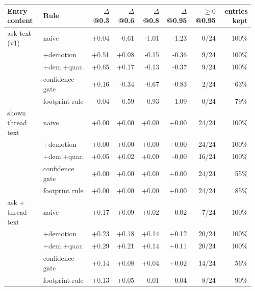 \begin{tabular}{llrrrrrr}\toprule Entry content & Rule & $\Delta$@0.3 & $\Delta$@0.6 & $\Delta$@0.8 & $\Delta$@0.95 & $\ge0$ @0.95 & entries kept\\\midrule
ask text (v1) & naive & +0.04 & -0.61 & -1.01 & -1.23 & 0/24 & 100\%\\
 & +demotion & +0.51 & +0.08 & -0.15 & -0.36 & 9/24 & 100\%\\
 & +dem.+quar. & +0.65 & +0.17 & -0.13 & -0.37 & 9/24 & 100\%\\
 & confidence gate & +0.16 & -0.34 & -0.67 & -0.83 & 2/24 & 63\%\\
 & footprint rule & -0.04 & -0.59 & -0.93 & -1.09 & 0/24 & 79\%\\
\addlinespace[2pt]
shown thread text & naive & +0.00 & +0.00 & +0.00 & +0.00 & 24/24 & 100\%\\
 & +demotion & +0.00 & +0.00 & +0.00 & +0.00 & 24/24 & 100\%\\
 & +dem.+quar. & +0.05 & +0.02 & +0.00 & -0.00 & 16/24 & 100\%\\
 & confidence gate & +0.00 & +0.00 & +0.00 & +0.00 & 24/24 & 55\%\\
 & footprint rule & +0.00 & +0.00 & +0.00 & +0.00 & 24/24 & 85\%\\
\addlinespace[2pt]
ask + thread text & naive & +0.17 & +0.09 & +0.02 & -0.02 & 7/24 & 100\%\\
 & +demotion & +0.23 & +0.18 & +0.14 & +0.12 & 20/24 & 100\%\\
 & +dem.+quar. & +0.29 & +0.21 & +0.14 & +0.11 & 20/24 & 100\%\\
 & confidence gate & +0.14 & +0.08 & +0.04 & +0.02 & 14/24 & 56\%\\
 & footprint rule & +0.13 & +0.05 & -0.01 & -0.04 & 8/24 & 90\%\\
\bottomrule\end{tabular}